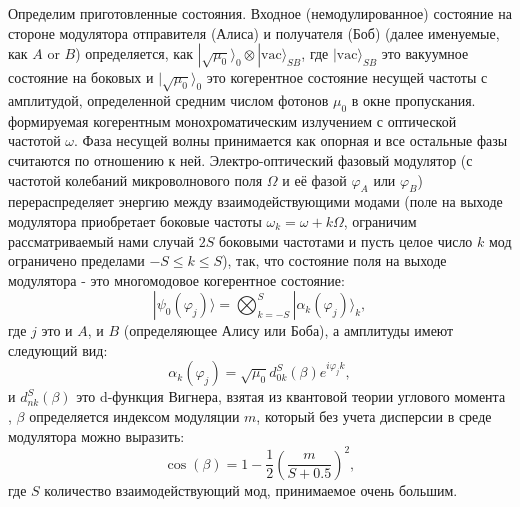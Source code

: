Определим приготовленные состояния. Входное (немодулированное) состояние на стороне модулятора отправителя (Алиса) и получателя (Боб) (далее именуемые, как $A$ or $B$) определяется, как $|\sqrt{\mu_0}\rangle_0\otimes|\mathrm{vac}\rangle_{SB}$, где $|\mathrm{vac}\rangle_{SB}$ это вакуумное состояние на боковых и $|\sqrt{\mu_0}\rangle_0$ это когерентное состояние несущей частоты с амплитудой, определенной средним числом фотонов $\mu_0$ в окне пропускания. формируемая когерентным монохроматическим излучением с оптической частотой $\omega$. Фаза несущей волны принимается как опорная и все остальные фазы считаются по отношению к ней. Электро-оптический фазовый модулятор (с частотой колебаний микроволнового поля $\Omega$ и её фазой $\varphi_A$ или $\varphi_B$) перераспределяет энергию между взаимодействующими модами (поле на выходе модулятора приобретает боковые частоты $\omega_k=\omega+k\Omega$, ограничим рассматриваемый нами случай $2S$ боковыми частотами и пусть целое число $k$ мод ограничено пределами $-S\le k\le S$), так, что состояние поля на выходе модулятора - это многомодовое когерентное состояние: 
%
\begin{equation}\label{phi}
|\psi_0(\varphi_j)\rangle = \bigotimes_{k=-S}^S|{\alpha_k(\varphi_j)}\rangle_k,
\end{equation}
%
где $j$ это и $A$, и $B$ (определяющее Алису или Боба), а амплитуды имеют следующий вид: 
%
\begin{equation}\label{alpha}
\alpha_k(\varphi_j)=\sqrt{\mu_0}d^S_{0k}(\beta)e^{i\varphi_jk},
\end{equation}
%
и $d^S_{nk}(\beta)$ это d-функция Вигнера, взятая из квантовой теории углового момента %
, $\beta$ определяется индексом модуляции $m$, который без учета дисперсии в среде модулятора можно выразить: 
%
\begin{equation}\label{betam}
\cos{({\beta})}=1-\frac{1}{2}{\left(\frac{m}{S+0.5}\right)^2},
\end{equation}
где $S$ количество взаимодействующий мод, принимаемое очень большим.

